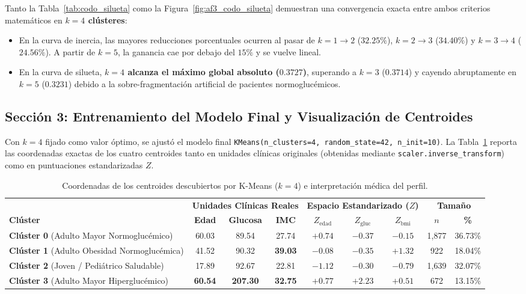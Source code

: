 Tanto la Tabla~\ref{tab:codo_silueta} como la Figura~\ref{fig:af3_codo_silueta} demuestran una convergencia exacta entre ambos criterios matemáticos en \textbf{$k = 4$ clústeres}:
\begin{itemize}
    \item En la curva de inercia, las mayores reducciones porcentuales ocurren al pasar de $k=1 \to 2$ ($32.25\%$), $k=2 \to 3$ ($34.40\%$) y $k=3 \to 4$ ($24.56\%$). A partir de $k=5$, la ganancia cae por debajo del $15\%$ y se vuelve lineal.
    \item En la curva de silueta, \textbf{$k = 4$ alcanza el máximo global absoluto ($0.3727$)}, superando a $k=3$ ($0.3714$) y cayendo abruptamente en $k=5$ ($0.3231$) debido a la sobre-fragmentación artificial de pacientes normoglucémicos.
\end{itemize}

\subsection{Sección 3: Entrenamiento del Modelo Final y Visualización de Centroides}

Con $k = 4$ fijado como valor óptimo, se ajustó el modelo final \texttt{KMeans(n\_clusters=4, random\_state=42, n\_init=10)}. La Tabla~\ref{tab:centroides} reporta las coordenadas exactas de los cuatro centroides tanto en unidades clínicas originales (obtenidas mediante \texttt{scaler.inverse\_transform}) como en puntuaciones estandarizadas $Z$.

\begin{table}[H]
    \centering
    \caption{Coordenadas de los centroides descubiertos por K-Means ($k = 4$) e interpretación médica del perfil.}
    \label{tab:centroides}
    \begin{tabular}{lccc|ccc|cc}
        \toprule
        & \multicolumn{3}{c|}{\textbf{Unidades Clínicas Reales}} & \multicolumn{3}{c|}{\textbf{Espacio Estandarizado ($Z$)}} & \multicolumn{2}{c}{\textbf{Tamaño}} \\
        \textbf{Clúster} & \textbf{Edad} & \textbf{Glucosa} & \textbf{IMC} & $Z_{\text{edad}}$ & $Z_{\text{gluc}}$ & $Z_{\text{bmi}}$ & $n$ & \textbf{\%} \\
        \midrule
        \textbf{Clúster 0} (Adulto Mayor Normoglucémico) & 60.03 & 89.54 & 27.74 & $+0.74$ & $-0.37$ & $-0.15$ & 1,877 & 36.73\% \\
        \textbf{Clúster 1} (Adulto Obesidad Normoglucémica) & 41.52 & 90.32 & \textbf{39.03} & $-0.08$ & $-0.35$ & $\mathbf{+1.32}$ & 922 & 18.04\% \\
        \textbf{Clúster 2} (Joven / Pediátrico Saludable) & 17.89 & 92.67 & 22.81 & $-1.12$ & $-0.30$ & $-0.79$ & 1,639 & 32.07\% \\
        \textbf{Clúster 3} (Adulto Mayor Hiperglucémico) & \textbf{60.54} & \textbf{207.30} & \textbf{32.75} & $\mathbf{+0.77}$ & $\mathbf{+2.23}$ & $+0.51$ & 672 & 13.15\% \\
        \bottomrule
    \end{tabular}
\end{table}

